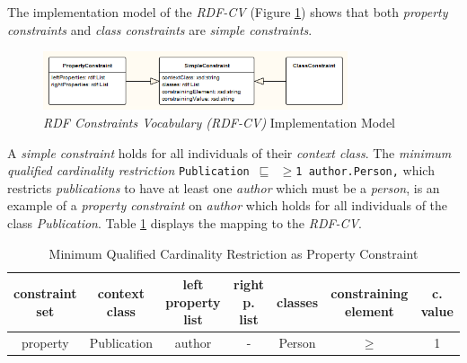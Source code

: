 \documentclass[a4paper,fontsize=11pt]{scrartcl}
\newcommand{\ms}[1]{\texttt{#1}}
\begin{document}
The implementation model of the \emph{RDF-CV} (Figure \ref{fig:RDF-CV-implementation-model}) shows that
both \emph{property constraints} and \emph{class constraints} are \emph{simple constraints}. 
\begin{figure}[H]
	\centering
		\includegraphics[width=0.80\textwidth]{images/RDF-CV-implementation-model.png}
	\caption{\emph{RDF Constraints Vocabulary (RDF-CV)} Implementation Model}
	\label{fig:RDF-CV-implementation-model}
\end{figure}
A \emph{simple constraint} holds for all individuals of their \emph{context class}.
The \emph{minimum qualified cardinality restriction} {\small\ms{Publication $\sqsubseteq$ $\geq$1 author.Person,}}
which restricts \emph{publications} to have at least one \emph{author} which must be a \emph{person},
is an example of a \emph{property constraint} on \emph{author}
which holds for all individuals of the class \emph{Publication}.
Table \ref{tab:property-constraint-cardinality-restriction} displays the mapping to the \emph{RDF-CV}.
\begin{table}[H]
  \scriptsize
  \sffamily
  \vspace{0cm}
	\caption{Minimum Qualified Cardinality Restriction as Property Constraint}
	\label{tab:property-constraint-cardinality-restriction}
	\centering
		\begin{tabular}{c|c|c|c|c|c|c}
      \textbf{constraint set} & \textbf{context class} & \textbf{left property list} & \textbf{right p. list} & \textbf{classes} & \textbf{constraining element} & \textbf{c. value} \\
      \hline
      property & Publication & author & - & Person & $\geq$ & 1 \\
		\end{tabular}
\end{table}
\end{document}
